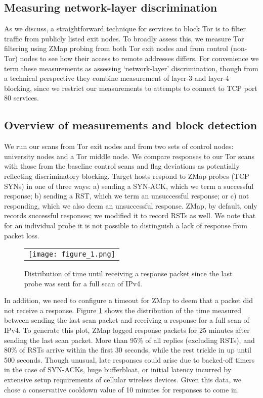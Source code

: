 \documentclass[12pt]{spieman}
\begin{document}
 
\tableofcontents
\newpage
\begin{spacing}{2}

\section{Measuring network-layer discrimination}
As we discuss, a straightforward technique for services to block Tor is to filter traffic from publicly listed exit nodes. To broadly assess this, we measure Tor filtering using ZMap probing from both Tor exit nodes and from control (non-Tor) nodes to see how their access to remote addresses differs. For convenience we term these measurements as assessing ‘network-layer’ discrimination, though from a technical perspective they combine measurement of layer-3 and layer-4 blocking, since we restrict our measurements to attempts to connect to TCP port 80 services. 

\subsection{Overview of measurements and block detection}

We run our scans from Tor exit nodes and from two sets of control nodes: university nodes and a Tor middle node. We compare responses to our Tor scans with those from the baseline control scans and flag deviations as potentially reflecting discriminatory blocking. Target hosts respond to ZMap probes (TCP SYNs) in one of three ways: a) sending a SYN-ACK, which we term a successful response; b) sending a RST, which we term an unsuccessful response; or c) not responding, which we also deem an unsuccessful response. ZMap, by default, only records successful responses; we modified it to record RSTs as well. We note that for an individual probe it is not possible to distinguish a lack of response from packet loss.

\begin{figure}
\begin{center}
\begin{tabular}{c}
\texttt{[image: figure\_1.png]}
\end{tabular}
\end{center}
\caption 
{ \label{fig:1}
Distribution of time until receiving a response packet since the last probe was sent for a full scan of IPv4. } 
\end{figure} 

In addition, we need to configure a timeout for ZMap to deem that a packet did not receive a response. Figure \ref{fig:1} shows the distribution of the time measured between sending the last scan packet and receiving a response for a full scan of IPv4. To generate this plot, ZMap logged response packets for 25 minutes after sending the last scan packet. More than 95\% of all replies (excluding RSTs), and 80\% of RSTs arrive within the first 30 seconds, while the rest trickle in up until 500 seconds. Though unusual, late responses could arise due to backed-off timers in the case of SYN-ACKs, huge bufferbloat, or initial latency incurred by extensive setup requirements of cellular wireless devices. Given this data, we chose a conservative cooldown value of 10 minutes for responses to come in.


\end{spacing}
\end{document}
